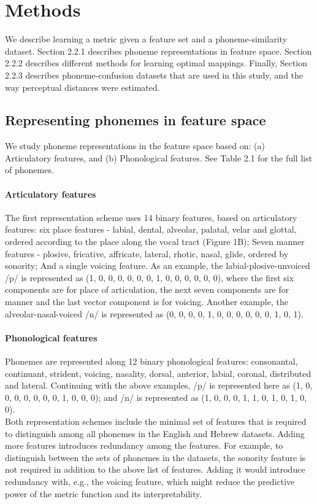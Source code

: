 \section{Methods}
We describe learning a metric given a feature set and a phoneme-similarity dataset. Section 2.2.1 describes phoneme representations in feature space. Section 2.2.2 describes different methods for learning optimal mappings. Finally, Section 2.2.3 describes phoneme-confusion datasets that are used in this study, and the way perceptual distances were estimated.

\subsection{Representing phonemes in feature space}
We study phoneme representations in the feature space based on: (a) Articulatory features, and (b) Phonological features. See Table 2.1 for the full list of phonemes.

\paragraph{Articulatory features} The first representation scheme uses 14 binary features, based on articulatory features: six place features - labial, dental, alveolar, palatal, velar and glottal, ordered according to the place along the vocal tract (Figure 1B); Seven manner features - plosive, fricative, affricate, lateral, rhotic, nasal, glide, ordered by sonority; And a single voicing feature. As an example, the labial-plosive-unvoiced /p/ is represented  as (1, 0, 0, 0, 0, 0, 0, 1, 0, 0, 0, 0, 0, 0), where the first six components are for place of articulation, the next seven components are for manner and the last vector component is for voicing. Another example, the alveolar-nasal-voiced /n/ is represented as (0, 0, 0, 0, 1, 0, 0, 0, 0, 0, 0, 1, 0, 1).

\paragraph{Phonological features} Phonemes are represented along 12 binary phonological features: consonantal, continuant, strident, voicing, nasality, dorsal, anterior, labial, coronal, distributed and lateral. Continuing with the above examples, /p/ is represented here as (1, 0, 0, 0, 0, 0, 0, 0, 1, 0, 0, 0); and /n/ is represented as (1, 0, 0, 0, 1, 1, 0, 1, 0, 1, 0, 0). \mbox{} \\

Both representation schemes include the minimal set of features that is required to distinguish among all phonemes in the English and Hebrew datasets. Adding more features introduces redundancy among the features. For example, to distinguish between the sets of phonemes in the datasets, the sonority feature is not required in addition to the above list of features. Adding it would introduce redundancy with, e.g., the voicing feature, which might reduce the predictive power of the metric function and its interpretability.


